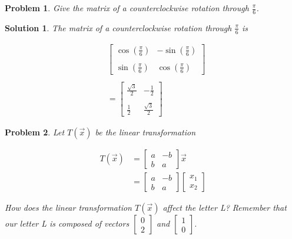 \documentclass{article}
\newtheorem{problem}{Problem}
\newtheorem*{solution}{Solution}
\begin{document}
\begin{problem}
Give the matrix of a counterclockwise rotation through $\displaystyle \frac{\pi}{6}$.
\end{problem}

\begin{solution}
The matrix of a counterclockwise rotation through $\displaystyle \frac{\pi}{6}$ is

\begin{align*}
& \begin{bmatrix}
\cos\left(\displaystyle \frac{\pi}{6}\right) & -\sin\left(\displaystyle \frac{\pi}{6}\right) \\ \\
\sin\left(\displaystyle \frac{\pi}{6}\right) & \cos\left(\displaystyle \frac{\pi}{6}\right)
\end{bmatrix} \\ \\
&=
\begin{bmatrix}
\displaystyle \frac{\sqrt{3}}{2} & -\displaystyle \frac{1}{2} \\ \\
\displaystyle \frac{1}{2} & \displaystyle \frac{\sqrt{3}}{2}
\end{bmatrix} 
\end{align*}
\end{solution}

\begin{problem}
Let $T(\vec{x})$ be the linear transformation

\begin{align*}
T(\vec{x}) &= \begin{bmatrix}a & -b \\ b & a \end{bmatrix} \vec{x} \\
		&= \begin{bmatrix}a & -b \\ b & a \end{bmatrix} \begin{bmatrix} x_{1} \\ x_{2} \end{bmatrix}
\end{align*}

How does the linear transformation $T(\vec{x})$ affect the letter L? Remember that our letter L is composed of vectors $\begin{bmatrix} 0 \\ 2 \end{bmatrix}$ and $\begin{bmatrix} 1 \\ 0 \end{bmatrix}$.
\end{problem}
\end{document}
